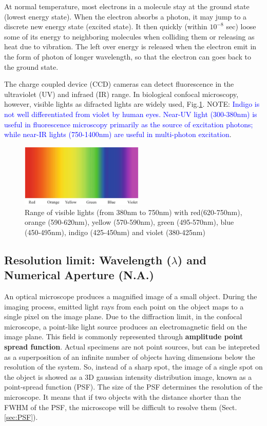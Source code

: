\begin{framed}
At normal temperature, most electrons in a molecule stay at the ground state
(lowest energy state). When the electron absorbs a photon, it may jump to a
discrete new energy state (excited state). It then quickly (within $10^{-8}$
sec) loose some of its energy to neighboring molecules when colliding them or
releasing as heat due to vibration. The left over energy is released when the
electron emit in the form of photon of longer wavelength, so that the electron
can goes back to the ground state. 
\end{framed}

The charge coupled device (CCD) cameras can detect fluorescence in the
ultraviolet (UV) and infraed (IR) range. In biological confocal microscopy,
however, visible lights as difracted lights are widely used,
Fig.\ref{fig:visible_lights}. NOTE:
\textcolor{blue}{Indigo is not well differentiated from violet by human eyes.
Near-UV light (300-380nm) is useful in fluorescence microscopy primarily as the source of
excitation photons; while near-IR lights (750-1400nm) are useful in multi-photon
excitation}.

\begin{figure}[hbt]
  \centerline{\includegraphics[height=3cm,
    angle=0]{./images/visible_lights.eps}}
  \caption{Range of visible lights (from 380nm to 750nm) with red(620-750nm),
  orange (590-620nm), yellow (570-590nm), green (495-570nm), blue (450-495nm),
  indigo (425-450nm) and violet (380-425nm)}
\label{fig:visible_lights}
\end{figure}



\subsection{Resolution limit: Wavelength ($\lambda$) and Numerical Aperture
(N.A.)}
\label{sec:resolution_limit}

An optical microscope produces a magnified image of a small object. During the
imaging process, emitted light rays from each point on the object maps to a
single pixel on the image plane. Due to the diffraction limit, in the confocal
microscope, a point-like light source produces an electromagnetic field on the
image plane. This field is commonly represented through {\bf amplitude  point
spread function}. Actual specimens are not point sources, but can be  intepreted
as a superposition of an infinite number of objects having dimensions  below the
resolution of the system. So, instead of a sharp spot, the image of a single
spot on the object is showed as a 3D gaussian intensity distribution image,
known as a point-spread function (PSF). The size of the PSF determines the
resolution of the microscope. It means that if two objects with the distance
shorter than the FWHM of the PSF, the microscope will be difficult to resolve
them (Sect.\ref{sec:PSF}).

